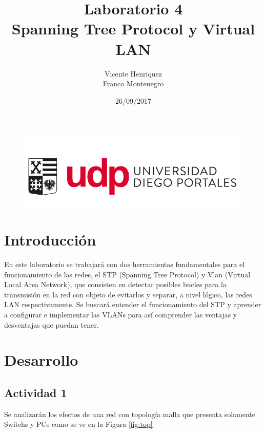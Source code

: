 \documentclass{article}
\begin{document}
\begin{figure}[t!]
\includegraphics[scale=0.3]{logo_udp.PNG}
\label{fig:udplogo}
\end{figure}

\title{\textbf{{Laboratorio 4 \\ Spanning Tree Protocol y Virtual LAN \vspace{10cm}}}}
\author{\hspace{8cm} Vicente Henriquez \\ \hspace{8cm} Franco Montenegro}
\date{\hspace{8cm} 26/09/2017}

\maketitle
\newpage

\tableofcontents
\newpage
\section{Introducción\vspace{0.5cm}}
En este laboratorio se trabajará con dos herramientas fundamentales para el funcionamiento de las redes, el STP (Spanning Tree Protocol) y Vlan (Virtual Local Area Network), que consisten en detectar posibles bucles para la transmisión en la red con objeto de evitarlos y separar, a nivel lógico, las redes LAN respectivamente. Se buscará entender el funcionamiento del STP y aprender a configurar e implementar las VLANs para así comprender las ventajas y desventajas que puedan tener.
\newpage
\section{Desarrollo\vspace{0.5cm}}
\subsection{Actividad 1\vspace{0.3cm}}
Se analizarán los efectos de una red con topología malla que presenta solamente Switchs y PCs como se ve en la Figura \ref{fig:top}
\end{document}
